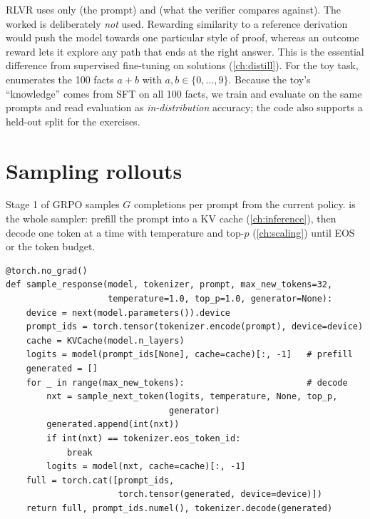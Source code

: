 RLVR uses only  (the prompt) and  (what the verifier compares
against). The worked  is deliberately \emph{not} used. Rewarding similarity
to a reference derivation would push the model towards one particular style of proof,
whereas an outcome reward lets it explore any path that ends at the right answer. This is
the essential difference from supervised fine-tuning on solutions (\cref{ch:distill}).
For the toy task,  enumerates the 100 facts $a+b$ with
$a,b\in\{0,\dots,9\}$. Because the toy's ``knowledge'' comes from SFT on all 100 facts, we
train and evaluate on the same prompts and read evaluation as \emph{in-distribution}
accuracy; the code also supports a held-out split for the exercises.

\section{Sampling rollouts}\label{sec:grpo:rollouts}

Stage 1 of GRPO samples $G$ completions per prompt from the current policy.
 is the whole sampler: prefill the prompt into a KV cache
(\cref{ch:inference}), then decode one token at a time with temperature and top-$p$
(\cref{ch:scaling}) until EOS or the token budget.

\begin{lstlisting}[caption={Unbatched rollout sampler (\texttt{labs/lab17\_grpo/solution.py}).},label={lst:grpo:sample}]
@torch.no_grad()
def sample_response(model, tokenizer, prompt, max_new_tokens=32,
                    temperature=1.0, top_p=1.0, generator=None):
    device = next(model.parameters()).device
    prompt_ids = torch.tensor(tokenizer.encode(prompt), device=device)
    cache = KVCache(model.n_layers)
    logits = model(prompt_ids[None], cache=cache)[:, -1]   # prefill
    generated = []
    for _ in range(max_new_tokens):                        # decode
        nxt = sample_next_token(logits, temperature, None, top_p,
                                generator)
        generated.append(int(nxt))
        if int(nxt) == tokenizer.eos_token_id:
            break
        logits = model(nxt, cache=cache)[:, -1]
    full = torch.cat([prompt_ids,
                      torch.tensor(generated, device=device)])
    return full, prompt_ids.numel(), tokenizer.decode(generated)
\end{lstlisting}

